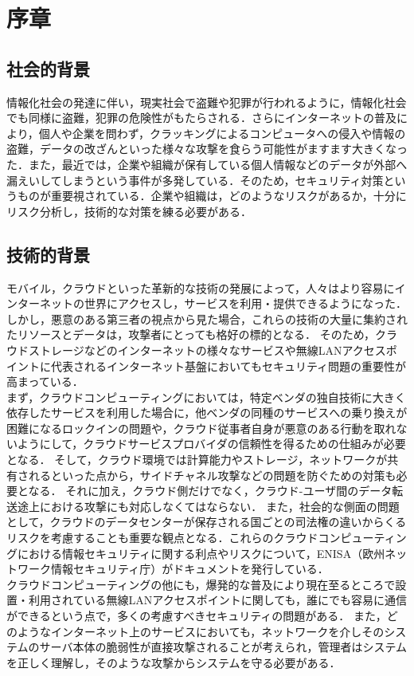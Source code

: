 \chapter{序章}

\section{社会的背景}
情報化社会の発達に伴い，現実社会で盗難や犯罪が行われるように，情報化社会でも同様に盗難，犯罪の危険性がもたらされる．さらにインターネットの普及により，個人や企業を問わず，クラッキングによるコンピュータへの侵入や情報の盗難，データの改ざんといった様々な攻撃を食らう可能性がますます大きくなった．また，最近では，企業や組織が保有している個人情報などのデータが外部へ漏えいしてしまうという事件が多発している．そのため，セキュリティ対策というものが重要視されている．企業や組織は，どのようなリスクがあるか，十分にリスク分析し，技術的な対策を練る必要がある．

\section{技術的背景}
モバイル，クラウドといった革新的な技術の発展によって，人々はより容易にインターネットの世界にアクセスし，サービスを利用・提供できるようになった．
しかし，悪意のある第三者の視点から見た場合，これらの技術の大量に集約されたリソースとデータは，攻撃者にとっても格好の標的となる．
そのため，クラウドストレージなどのインターネットの様々なサービスや無線LANアクセスポイントに代表されるインターネット基盤においてもセキュリティ問題の重要性が高まっている．\\
まず，クラウドコンピューティングにおいては，特定ベンダの独自技術に大きく依存したサービスを利用した場合に，他ベンダの同種のサービスへの乗り換えが困難になるロックインの問題や，クラウド従事者自身が悪意のある行動を取れないようにして，クラウドサービスプロバイダの信頼性を得るための仕組みが必要となる．
そして，クラウド環境では計算能力やストレージ，ネットワークが共有されるといった点から，サイドチャネル攻撃などの問題を防ぐための対策も必要となる．
それに加え，クラウド側だけでなく，クラウド-ユーザ間のデータ転送途上における攻撃にも対応しなくてはならない．
また，社会的な側面の問題として，クラウドのデータセンターが保存される国ごとの司法権の違いからくるリスクを考慮することも重要な観点となる．これらのクラウドコンピューティングにおける情報セキュリティに関する利点やリスクについて，ENISA（欧州ネットワーク情報セキュリティ庁）がドキュメント\cite{cloudrisk}を発行している．\\
クラウドコンピューティングの他にも，爆発的な普及により現在至るところで設置・利用されている無線LANアクセスポイントに関しても，誰にでも容易に通信ができるという点で，多くの考慮すべきセキュリティの問題がある．
また，どのようなインターネット上のサービスにおいても，ネットワークを介しそのシステムのサーバ本体の脆弱性が直接攻撃されることが考えられ，管理者はシステムを正しく理解し，そのような攻撃からシステムを守る必要がある．

